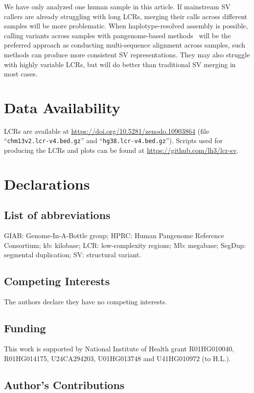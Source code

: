 \documentclass[a4paper,num-refs]{oup-contemporary}
\begin{document}
We have only analyzed one human sample in this article.
If mainstream SV callers are already struggling with long LCRs,
merging their calls across different samples will be more problematic.
When haplotype-resolved assembly is possible,
calling variants across samples with pangenome-based methods~\cite{Li:2020aa,Hickey:2024aa,Garrison:2024ab}
will be the preferred approach as conducting multi-sequence alignment across samples,
such methods can produce more consistent SV representations.
They may also struggle with highly variable LCRs,
but will do better than traditional SV merging in most cases.

\section{Data Availability}

LCRs are available at \url{https://doi.org/10.5281/zenodo.10903864}
(file ``{\tt chm13v2.lcr-v4.bed.gz}'' and ``{\tt hg38.lcr-v4.bed.gz}'').
Scripts used for producing the LCRs and plots
can be found at \url{https://github.com/lh3/lcr-sv}.

\section{Declarations}

\subsection{List of abbreviations}

GIAB: Genome-In-A-Bottle group;
HPRC: Human Pangenome Reference Consortium;
kb: kilobase;
LCR: low-complexity regions;
Mb: megabase;
SegDup: segmental duplication;
SV: structural variant.

\subsection{Competing Interests}

The authors declare they have no competing interests.

\subsection{Funding}

This work is supported by National Institute of Health grant
R01HG010040,
R01HG014175,
U24CA294203,
U01HG013748
and U41HG010972 (to H.L.).

\subsection{Author's Contributions}
\end{document}
